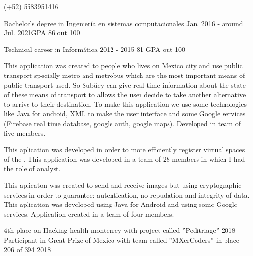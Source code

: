 \documentclass{resume}
\begin{document}
{}
{}
{(+52) 5583951416}

{Bachelor's degree in Ingeniería en sistemas computacionales}
{Jan. 2016 - around Jul. 2021}{GPA 86 out 100}\break

{Technical career in Informática}
{2012 - 2015} 
{81 GPA out 100}

{This application was created to people who lives on Mexico city and use public transport specially metro and metrobus which are the most important means of public transport used. So Subüey can give real time information about the state of these means of transport to allows the user decide to take another alternative to arrive to their destination. To make this application we use some technologies like Java for android, XML to make the user interface and some Google services (Firebase real time database, google auth, google maps). Developed in team of five members.}

{This aplication was developed in order to more efficiently register virtual spaces of the . This application was developed in a team of 28 members in which I had the role of analyst.}

{This aplicaton was created to send and receive images but using cryptographic services in order to guarantee: autentication, no repudation and integrity of data. This aplication was developed using Java for Android and using some Google services. Application created in a team of four members.}

{4th place on Hacking health monterrey with project called ''Peditriage''}
{2018}
{Participant in Great Prize of Mexico with team called ''MXerCoders'' in place 206 of 394}
{2018}
\end{document}
